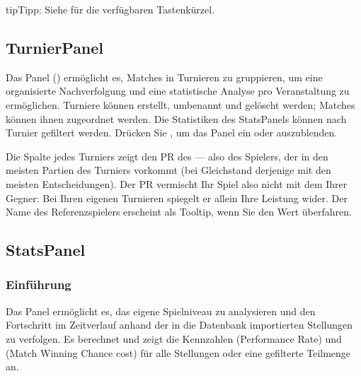 \documentclass[letterpaper,10pt,german]{sphinxmanual}
\begin{document}
\begin{sphinxadmonition}{tip}{Tipp:}
\sphinxAtStartPar
Siehe {\hyperref[\detokenize{raccourcis:raccourcis}]{}} für die verfügbaren Tastenkürzel.
\end{sphinxadmonition}


\subsection{Turnier\sphinxhyphen{}Panel}
\label{\detokenize{manuel:panneau-tournois}}\label{\detokenize{manuel:id8}}
\sphinxAtStartPar
Das Panel  () ermöglicht es, Matches in Turnieren zu gruppieren, um eine organisierte Nachverfolgung und eine statistische Analyse pro Veranstaltung zu ermöglichen. Turniere können erstellt, umbenannt und gelöscht werden; Matches können ihnen zugeordnet werden. Die Statistiken des Stats\sphinxhyphen{}Panels können nach Turnier gefiltert werden. Drücken Sie , um das Panel ein\sphinxhyphen{} oder auszublenden.

\sphinxAtStartPar
Die Spalte  jedes Turniers zeigt den PR des  — also des Spielers, der in den meisten Partien des Turniers vorkommt (bei Gleichstand derjenige mit den meisten Entscheidungen). Der PR vermischt Ihr Spiel also nicht mit dem Ihrer Gegner: Bei Ihren eigenen Turnieren spiegelt er allein Ihre Leistung wider. Der Name des Referenzspielers erscheint als Tooltip, wenn Sie den Wert überfahren.


\subsection{Stats\sphinxhyphen{}Panel}
\label{\detokenize{manuel:panneau-stats}}\label{\detokenize{manuel:stats}}

\subsubsection{Einführung}
\label{\detokenize{manuel:id9}}
\sphinxAtStartPar
Das Panel  ermöglicht es, das eigene Spielniveau zu analysieren und den Fortschritt im Zeitverlauf anhand der in die Datenbank importierten Stellungen zu verfolgen. Es berechnet und zeigt die Kennzahlen  (Performance Rate) und  (Match Winning Chance cost) für alle Stellungen oder eine gefilterte Teilmenge an.
\end{document}
